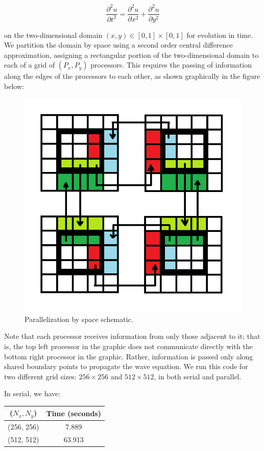 \documentclass[letterpaper,12pt]{article}
\begin{document}
\begin{equation*}
\frac{\partial^2 u}{\partial t^2} = \frac{\partial^2 u}{\partial x^2} + \frac{\partial^2 u}{\partial y^2}
\end{equation*}

on the two-dimensional domain $(x, y) \in [0,1]\times[0,1]$ for evolution in time. We partition the domain by space using a second order central difference approximation, assigning a rectangular portion of the two-dimensional domain to each of a grid of $(P_x, P_y)$ processors. This requires the passing of information along the edges of the processors to each other, as shown graphically in the figure below:

\begin{figure}[H]
\begin{center}
\includegraphics[width=0.5\linewidth]{decomp.png}
\caption{Parallelization by space schematic.}
\label{fig:spaceparallel}
\end{center}
\end{figure}

Note that each processor receives information from only those adjacent to it; that is, the top left processor in the graphic does not communicate directly with the bottom right processor in the graphic. Rather, information is passed only along shared boundary points to propagate the wave equation. We run this code for two different grid sizes: $256\times 256$ and $512\times 512$, in both serial and parallel.

In serial, we have:

\begin{center}
\begin{tabular}{|c|c|} \hline
($N_x, N_y$) & Time (seconds)\\ \hline
(256, 256) & 7.889\\ \hline %
(512, 512) & 63.913\\ \hline %
\end{tabular}
\end{center}
\end{document}

